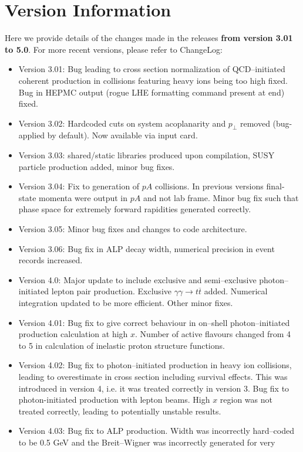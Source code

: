 \documentclass[12pt]{article}
\begin{document}
\section{Version Information}

Here we provide details of the changes made in the releases {\bf from version 3.01 to 5.0}. For more recent versions, please refer to ChangeLog:

\begin{itemize}

\item Version 3.01: Bug leading to cross section normalization of QCD--initiated coherent production in collisions featuring heavy ions being too 
high fixed. Bug in HEPMC output (rogue LHE formatting command present at end) fixed.
\item Version 3.02: Hardcoded cuts on system acoplanarity and $p_\perp$ removed (bug- applied by default). Now available via input card.
\item Version 3.03: shared/static libraries produced upon compilation, SUSY particle production added, minor bug fixes.
\item Version 3.04: Fix to generation of $pA$ collisions. In previous versions final-state momenta were output in $pA$ and not lab frame. Minor bug 
fix such that phase space for extremely forward rapidities generated correctly.
\item Version 3.05: Minor bug fixes and changes to code architecture.
\item Version 3.06: Bug fix in ALP decay width, numerical precision in event records increased.
\item Version 4.0: Major update to include exclusive and semi--exclusive photon--initiated lepton pair production. Exclusive 
$\gamma\gamma \to t\overline{t}$ added. Numerical integration updated to be more efficient. Other minor fixes.
\item Version 4.01: Bug fix to give correct behaviour in on--shell photon--initiated production calculation at high $x$. Number of active flavours 
changed from 4 to 5 in calculation of inelastic proton structure functions.
\item Version 4.02: Bug fix to photon--initiated production in heavy ion collisions, leading to overestimate in cross section including survival effects.
 This was introduced in version 4, i.e. it was treated correctly in version 3. Bug fix to photon-initiated production with lepton beams. High $x$ region 
 was not treated correctly, leading to potentially unstable results.
\item Version 4.03: Bug fix to ALP production. Width was incorrectly hard--coded to be 0.5 GeV and the Breit--Wigner was incorrectly generated for very 

\end{itemize}
\end{document}
